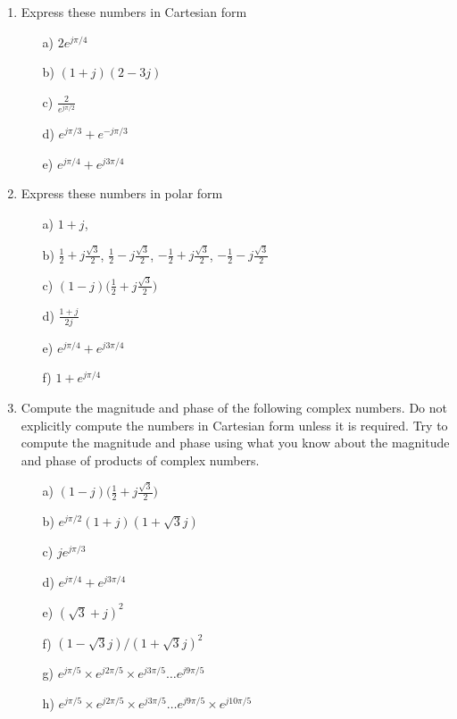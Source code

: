 \begin{enumerate}

\item Express these numbers in Cartesian form
\begin{itemize}
  \item[a)] $2 e^{j \pi/4}$
  \item[b)] $(1+j)(2-3j)$
  \item[c)] $\frac{2}{e^{j \pi/2}}$
  \item[d)] $e^{j \pi/3} + e^{-j \pi/3}$
  \item[e)] $e^{j \pi/4} + e^{j 3 \pi/4}$
  \end{itemize}

\item Express these numbers in polar form
\begin{itemize}
  \item[a)] $1+j$,
  \item[b)] $\frac{1}{2} + j \frac{\sqrt{3}}{2}$, $\frac{1}{2} - j \frac{\sqrt{3}}{2}$, $-\frac{1}{2} + j \frac{\sqrt{3}}{2}$, $-\frac{1}{2} - j \frac{\sqrt{3}}{2}$
  \item[c)] $(1-j) \bigg(\frac{1}{2} + j \frac{\sqrt{3}}{2}\bigg)$
  \item[d)] $\frac{1+j}{2j}$
  \item[e)] $e^{j \pi/4} + e^{j 3 \pi/4}$
  \item[f)] $1+e^{j\pi/4}$
\end{itemize}


\item Compute the magnitude and phase of the following complex numbers. Do not explicitly compute the numbers in Cartesian form unless it is required. Try to compute the magnitude and phase using what you know about the magnitude and phase of products of complex numbers.
    \begin{itemize}
      \item[a)] $(1-j) \bigg(\frac{1}{2} + j \frac{\sqrt{3}}{2}\bigg)$
      \item[b)] $e^{j\pi/2} (1+j) (1+\sqrt{3}j)$
      \item[c)] $j e^{j \pi/3}$
      \item[d)] $e^{j \pi/4} + e^{j 3 \pi/4}$
      \item[e)] $(\sqrt{3}+j)^2$
      \item[f)] $(1-\sqrt{3}j)/(1+\sqrt{3}j)^2$
      \item[g)] $e^{j \pi/5} \times e^{j 2 \pi/5} \times e^{j 3 \pi/5} \ldots e^{j 9 \pi/5}$
      \item[h)] $e^{j \pi/5} \times e^{j 2 \pi/5} \times e^{j 3 \pi/5} \ldots e^{j 9 \pi/5} \times e^{j 10 \pi/5} $
    \end{itemize}


\end{enumerate}

